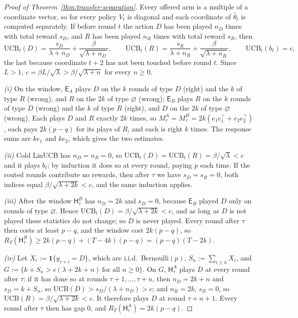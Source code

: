 \documentclass{article}
\theoremstyle{definition}
\theoremstyle{remark}
\newcommand{\ind}{\mathbf{1}}
\theoremstyle{remark}
\newcommand{\Exp}{\mathsf{E}}
\newcommand{\Hyb}{\mathsf{H}}
\begin{document}
\begin{proof}[Proof of Theorem~\ref{thm:transfer-separation}]
Every offered arm is a multiple of a coordinate vector, so for every policy
$V_t$ is diagonal and each coordinate of $\widehat\theta_t$ is computed
separately. If before round $t$ the action $D$ has been played $n_D$ times with
total reward $s_D$, and $R$ has been played $n_R$ times with total reward
$s_R$, then
\[
\mathrm{UCB}_t(D)=\frac{s_D}{\lambda+n_D}+\frac{\beta}{\sqrt{\lambda+n_D}},\qquad
\mathrm{UCB}_t(R)=\frac{s_R}{\lambda+n_R}+\frac{\beta}{\sqrt{\lambda+n_R}},\qquad
\mathrm{UCB}_t(b_t)=c,
\]
the last because coordinate $t+2$ has not been touched before round $t$.
Since $L>1$, $c=\beta L/\sqrt\lambda>\beta/\sqrt{\lambda+n}$ for every
$n\ge0$.

\emph{(i)} On the window, $\Exp_A$ plays $D$ on the $k$ rounds of type $D$
(right) and the $k$ of type $R$ (wrong), and $R$ on the $2k$ of type
$\varnothing$ (wrong); $\Exp_B$ plays $R$ on the $k$ rounds of type $D$ (wrong)
and the $k$ of type $R$ (right), and $D$ on the $2k$ of type $\varnothing$
(wrong). Each plays $D$ and $R$ exactly $2k$ times, so
$M^A_\tau=M^B_\tau=2k(e_1e_1^\top+e_2e_2^\top)$, each pays $2k(p-q)$ for its
plays of $R$, and each is right $k$ times. The response sums are $ke_1$ and
$ke_2$, which gives the two estimates.

\emph{(ii)} Cold LinUCB has $n_D=n_R=0$, so $\mathrm{UCB}_t(D)=\mathrm{UCB}_t(R)
=\beta/\sqrt\lambda<c$ and it plays $b_t$; by induction it does so at every
round, paying $p$ each time. If the routed rounds contribute no rewards, then
after $\tau$ we have $s_D=s_R=0$, both indices equal $\beta/\sqrt{\lambda+2k}<c$,
and the same induction applies.

\emph{(iii)} After the window $\Hyb^B_\tau$ has $n_D=2k$ and $s_D=0$, because
$\Exp_B$ played $D$ only on rounds of type $\varnothing$. Hence
$\mathrm{UCB}_t(D)=\beta/\sqrt{\lambda+2k}<c$, and as long as $D$ is not
played these statistics do not change; so $D$ is never played. Every round
after $\tau$ then costs at least $p-q$, and the window cost $2k(p-q)$, so
$R_T(\Hyb^B_\tau)\ge2k(p-q)+(T-4k)(p-q)=(p-q)(T-2k)$.

\emph{(iv)} Let $X_i:=\ind\{y_{\tau+i}=D\}$, which are i.i.d.\ Bernoulli$(p)$,
$S_n:=\sum_{i\le n}X_i$, and
$G:=\{k+S_n>c(\lambda+2k+n)\ \text{for all }n\ge0\}$. On $G$, $\Hyb^A_\tau$
plays $D$ at every round after $\tau$: if it has done so at rounds
$\tau+1,\dots,\tau+n$, then $n_D=2k+n$ and $s_D=k+S_n$, so
$\mathrm{UCB}(D)>s_D/(\lambda+n_D)>c$; and $n_R=2k$, $s_R=0$, so
$\mathrm{UCB}(R)=\beta/\sqrt{\lambda+2k}<c$. It therefore plays $D$ at round
$\tau+n+1$. Every round after $\tau$ then has gap $0$, and
$R_T(\Hyb^A_\tau)=2k(p-q)$.


\end{proof}
\end{document}
